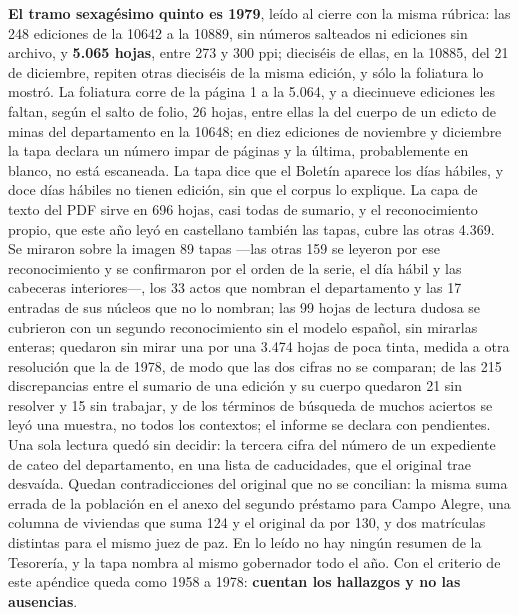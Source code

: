 \textbf{El tramo sexagésimo quinto es 1979}, leído al cierre con la misma rúbrica: las 248 ediciones de la 10642 a la 10889, sin números salteados ni ediciones sin archivo, y \textbf{5.065 hojas}, entre 273 y 300 ppi; dieciséis de ellas, en la 10885, del 21 de diciembre, repiten otras dieciséis de la misma edición, y sólo la foliatura lo mostró. La foliatura corre de la página 1 a la 5.064, y a diecinueve ediciones les faltan, según el salto de folio, 26 hojas, entre ellas la del cuerpo de un edicto de minas del departamento en la 10648; en diez ediciones de noviembre y diciembre la tapa declara un número impar de páginas y la última, probablemente en blanco, no está escaneada. La tapa dice que el Boletín aparece los días hábiles, y doce días hábiles no tienen edición, sin que el corpus lo explique. La capa de texto del PDF sirve en 696 hojas, casi todas de sumario, y el reconocimiento propio, que este año leyó en castellano también las tapas, cubre las otras 4.369. Se miraron sobre la imagen 89 tapas ---las otras 159 se leyeron por ese reconocimiento y se confirmaron por el orden de la serie, el día hábil y las cabeceras interiores---, los 33 actos que nombran el departamento y las 17 entradas de sus núcleos que no lo nombran; las 99 hojas de lectura dudosa se cubrieron con un segundo reconocimiento sin el modelo español, sin mirarlas enteras; quedaron sin mirar una por una 3.474 hojas de poca tinta, medida a otra resolución que la de 1978, de modo que las dos cifras no se comparan; de las 215 discrepancias entre el sumario de una edición y su cuerpo quedaron 21 sin resolver y 15 sin trabajar, y de los términos de búsqueda de muchos aciertos se leyó una muestra, no todos los contextos; el informe se declara con pendientes. Una sola lectura quedó sin decidir: la tercera cifra del número de un expediente de cateo del departamento, en una lista de caducidades, que el original trae desvaída. Quedan contradicciones del original que no se concilian: la misma suma errada de la población en el anexo del segundo préstamo para Campo Alegre, una columna de viviendas que suma 124 y el original da por 130, y dos matrículas distintas para el mismo juez de paz. En lo leído no hay ningún resumen de la Tesorería, y la tapa nombra al mismo gobernador todo el año. Con el criterio de este apéndice queda como 1958 a 1978: \textbf{cuentan los hallazgos y no las ausencias}.

